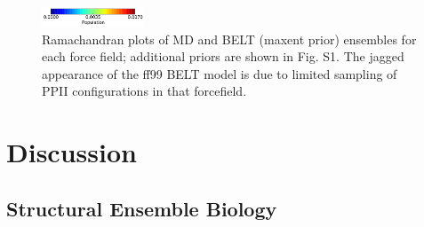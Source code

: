 \documentclass[journal=jacsat,manuscript=article]{achemso}
\begin{document}
\begin{figure}


\includegraphics[width=3.05cm]{figures/ALA3_rama_colorbar.pdf}


\caption{
Ramachandran plots of MD and BELT (maxent prior) ensembles for each force field; additional priors are shown in Fig. S1.  The jagged appearance of the ff99 BELT model is due to limited sampling of PPII configurations in that forcefield.  
}
\label{figure:Rama}
\end{figure}

\section*{Discussion}

\subsection*{Structural Ensemble Biology}
\end{document}
